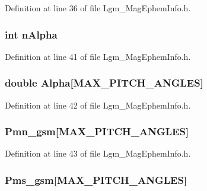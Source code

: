 Definition at line 36 of file Lgm\_\-MagEphemInfo.h.\hypertarget{struct_lgm___mag_ephem_info_b434059765e60f2934e7de8fe5eb50db}{
\subsubsection[{nAlpha}]{\setlength{\rightskip}{0pt plus 5cm}int {\bf nAlpha}}}
\label{struct_lgm___mag_ephem_info_b434059765e60f2934e7de8fe5eb50db}




Definition at line 41 of file Lgm\_\-MagEphemInfo.h.\hypertarget{struct_lgm___mag_ephem_info_0083768551a2459ebaafb84f97c4decd}{
\subsubsection[{Alpha}]{\setlength{\rightskip}{0pt plus 5cm}double {\bf Alpha}\mbox{[}MAX\_\-PITCH\_\-ANGLES\mbox{]}}}
\label{struct_lgm___mag_ephem_info_0083768551a2459ebaafb84f97c4decd}




Definition at line 42 of file Lgm\_\-MagEphemInfo.h.\hypertarget{struct_lgm___mag_ephem_info_07d64e5d5028ce92c07e7b9f8a62aed0}{
\subsubsection[{Pmn\_\-gsm}]{ {\bf Pmn\_\-gsm}\mbox{[}MAX\_\-PITCH\_\-ANGLES\mbox{]}}}
\label{struct_lgm___mag_ephem_info_07d64e5d5028ce92c07e7b9f8a62aed0}




Definition at line 43 of file Lgm\_\-MagEphemInfo.h.\hypertarget{struct_lgm___mag_ephem_info_1d78a2b78227bd683d37e3b7eee614e9}{
\subsubsection[{Pms\_\-gsm}]{ {\bf Pms\_\-gsm}\mbox{[}MAX\_\-PITCH\_\-ANGLES\mbox{]}}}
\label{struct_lgm___mag_ephem_info_1d78a2b78227bd683d37e3b7eee614e9}




